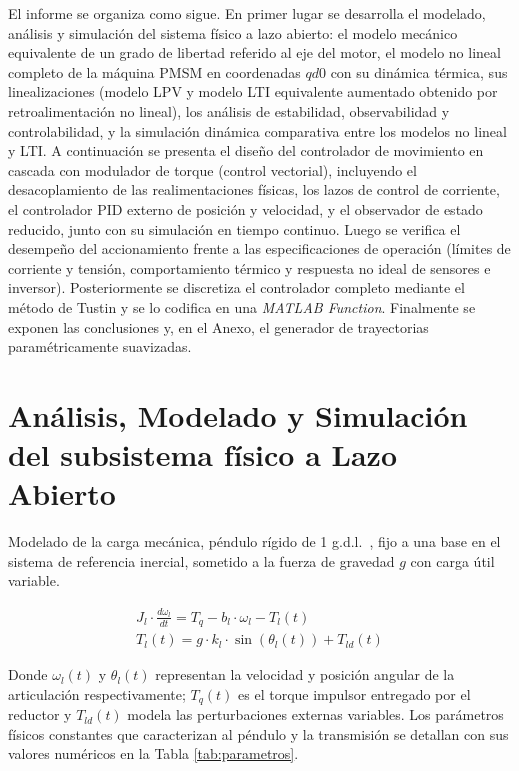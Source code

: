 \documentclass[12pt, a4paper,journal, onecolumn, compsoc]{IEEEtran}
\begin{document}
El informe se organiza como sigue. En primer lugar se desarrolla el modelado, análisis y simulación del sistema físico a lazo abierto: el modelo mecánico equivalente de un grado de libertad referido al eje del motor, el modelo no lineal completo de la máquina PMSM en coordenadas $qd0$ con su dinámica térmica, sus linealizaciones (modelo LPV y modelo LTI equivalente aumentado obtenido por retroalimentación no lineal), los análisis de estabilidad, observabilidad y controlabilidad, y la simulación dinámica comparativa entre los modelos no lineal y LTI. A continuación se presenta el diseño del controlador de movimiento en cascada con modulador de torque (control vectorial), incluyendo el desacoplamiento de las realimentaciones físicas, los lazos de control de corriente, el controlador PID externo de posición y velocidad, y el observador de estado reducido, junto con su simulación en tiempo continuo. Luego se verifica el desempeño del accionamiento frente a las especificaciones de operación (límites de corriente y tensión, comportamiento térmico y respuesta no ideal de sensores e inversor). Posteriormente se discretiza el controlador completo mediante el método de Tustin y se lo codifica en una \textit{MATLAB Function}. Finalmente se exponen las conclusiones y, en el Anexo, el generador de trayectorias paramétricamente suavizadas.

\section{Análisis, Modelado y Simulación del subsistema físico a Lazo Abierto}
Modelado de la carga mecánica, péndulo rígido de 1 g.d.l.~\cite{kelly_robot}, fijo a una base en el sistema de referencia inercial, sometido a la fuerza de gravedad \(g\) con carga útil variable.

\begin{align}
    J_l\cdot \frac{d\omega_l}{dt} = T_q - b_l\cdot \omega_l - T_l(t)  \\
    T_l(t) = g\cdot k_l \cdot \sin(\theta_l(t)) + T_{ld}(t)
\end{align}

Donde $\omega_l(t)$ y $\theta_l(t)$ representan la velocidad y posición angular de la articulación respectivamente; $T_q(t)$ es el torque impulsor entregado por el reductor y $T_{ld}(t)$ modela las perturbaciones externas variables. Los parámetros físicos constantes que caracterizan al péndulo y la transmisión se detallan con sus valores numéricos en la Tabla \ref{tab:parametros}.
\end{document}
